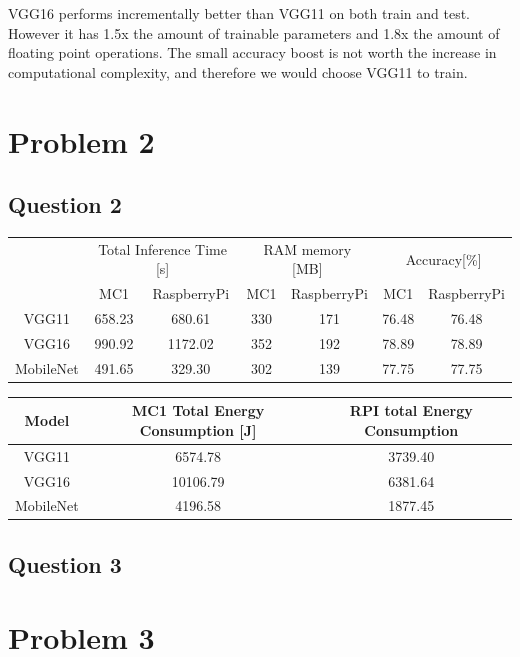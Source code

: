 \documentclass{article}
\begin{document}
VGG16 performs incrementally better than VGG11 on both train and test. However it has 1.5x the amount of trainable parameters and 1.8x the amount of floating point operations. 
The small accuracy boost is not worth the increase in computational complexity, and therefore we would choose VGG11 to train. 

\section*{Problem 2}
\subsection*{Question 2}
\begin{center}
\begin{tabular}{|*{7}{c|}}
    \hline
      & \multicolumn{2}{c|}{Total Inference Time [s]}  & \multicolumn{2}{c|}{RAM memory [MB]} & \multicolumn{2}{c|}{Accuracy[\%]} \\
    \cline{1-7}
      & MC1 & RaspberryPi & MC1 & RaspberryPi & MC1 & RaspberryPi \\
    \hline
    VGG11 & 658.23 & 680.61 & 330 & 171 & 76.48 & 76.48\\
    \hline
    VGG16 & 990.92 & 1172.02 & 352 & 192 & 78.89 & 78.89\\
    \hline
    MobileNet & 491.65 & 329.30 & 302 & 139 & 77.75 & 77.75\\
    \hline
\end{tabular}
\end{center}

\begin{center}
    \begin{tabular}{|*{3}{c|}}
        \hline
        Model & MC1 Total Energy Consumption [J] & RPI total Energy Consumption \\
        \hline
        VGG11 & 6574.78 & 3739.40 \\
        \hline
        VGG16 & 10106.79 & 6381.64 \\
        \hline
        MobileNet & 4196.58 & 1877.45 \\
        \hline
    \end{tabular}
\end{center}
\subsection*{Question 3}
\section*{Problem 3}
\end{document}
